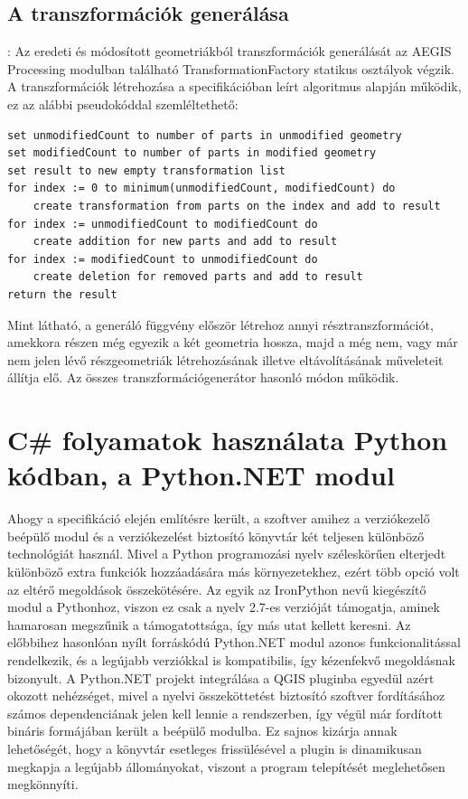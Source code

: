 \subsection{A transzformációk generálása}:
Az eredeti és módosított geometriákból transzformációk generálását az AEGIS Processing modulban található TransformationFactory statikus osztályok végzik.
A transzformációk létrehozása a specifikációban leírt algoritmus alapján működik, ez az alábbi pseudokóddal szemléltethető:
\begin{lstlisting}[language={[Sharp]C}]
set unmodifiedCount to number of parts in unmodified geometry
set modifiedCount to number of parts in modified geometry
set result to new empty transformation list
for index := 0 to minimum(unmodifiedCount, modifiedCount) do
	create transformation from parts on the index and add to result
for index := unmodifiedCount to modifiedCount do
	create addition for new parts and add to result
for index := modifiedCount to unmodifiedCount do
	create deletion for removed parts and add to result
return the result
\end{lstlisting}
Mint látható, a generáló függvény először létrehoz annyi résztranszformációt, amekkora részen még egyezik a két geometria hossza, majd a még nem, vagy már nem jelen lévő részgeometriák létrehozásának illetve eltávolításának műveleteit állítja elő. Az összes transzformációgenerátor hasonló módon működik.

\section{C\# folyamatok használata Python kódban, a Python.NET modul }
Ahogy a specifikáció elején említésre került, a szoftver amihez a verziókezelő beépülő modul és a verziókezelést biztosító könyvtár két teljesen különböző technológiát használ. Mivel a Python programozási nyelv széleskörűen elterjedt különböző extra funkciók hozzáadására más környezetekhez, ezért több opció volt az eltérő megoldások összekötésére. Az egyik az IronPython nevű kiegészítő modul a Pythonhoz, viszon ez csak a nyelv 2.7-es verzióját támogatja, aminek hamarosan megszűnik a támogatottsága, így más utat kellett keresni. Az előbbihez hasonlóan nyílt forráskódú Python.NET modul azonos funkcionalitással rendelkezik, és a legújabb verziókkal is kompatibilis, így kézenfekvő megoldásnak bizonyult. A Python.NET projekt integrálása a QGIS pluginba egyedül azért okozott nehézséget, mivel a nyelvi összeköttetést biztosító szoftver fordításához számos dependenciának jelen kell lennie a rendszerben, így végül már fordított bináris formájában került a beépülő modulba. Ez sajnos kizárja annak lehetőségét, hogy a könyvtár esetleges frissülésével a plugin is dinamikusan megkapja a legújabb állományokat, viszont a program telepítését meglehetősen megkönnyíti.
